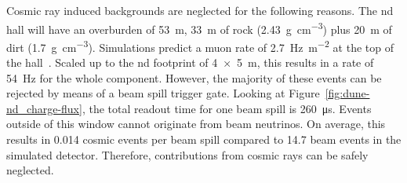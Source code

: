 Cosmic ray induced backgrounds are neglected for the following reasons.
The \gls{nd} hall will have an overburden of \SI{53}{\metre}, \SI{33}{\metre} of rock (\SI{2.43}{\gram\per\centi\metre\cubed}) plus \SI{20}{\metre} of dirt (\SI{1.7}{\gram\per\centi\metre\cubed}).
Simulations predict a muon rate of \SI{2.7}{\hertz\per\metre\squared} at the top of the hall~\cite{dune_ndtfr}.
Scaled up to the \AC{} \gls{nd} footprint of \SI{4 x 5}{\metre}, this results in a rate of \SI{54}{\hertz} for the whole \lartpc{} component.
However, the majority of these events can be rejected by means of a beam spill trigger gate.
Looking at Figure~\ref{fig:dune-nd_charge-flux}, the total readout time for one beam spill is \SI{260}{\micro\second}.
Events outside of this window cannot originate from beam neutrinos.
On average, this results in \num{0.014} cosmic events per beam spill compared to \num{14.7} beam events in the simulated detector.
Therefore, contributions from cosmic rays can be safely neglected.

